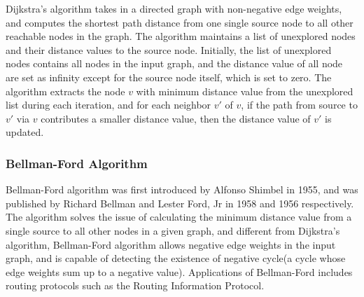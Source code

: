 Dijkstra's algorithm takes in a directed graph with non-negative edge weights, and computes the shortest path distance from one single source node to all other reachable nodes in the graph. The algorithm maintains a list of unexplored nodes and their distance values to the source node. Initially, the list of unexplored nodes contains all nodes in the input graph, and the distance value of all node are set as infinity except for the source node itself, which is set to zero. The algorithm extracts the node $v$ with minimum distance value from the unexplored list during each iteration, and for each neighbor $v'$ of $v$, if the path from source to $v'$ via $v$ contributes a smaller distance value, then the distance value of $v'$ is updated. 

\subsubsection*{Bellman-Ford Algorithm}
Bellman-Ford algorithm was first introduced by Alfonso Shimbel in 1955, and was published by Richard Bellman and Lester Ford, Jr in 1958 and 1956 respectively. The algorithm solves the issue of calculating the minimum distance value from a single source to all other nodes in a given graph, and different from Dijkstra's algorithm, Bellman-Ford algorithm allows negative edge weights in the input graph, and is capable of detecting the existence of negative cycle(a cycle whose edge weights sum up to a negative value). Applications of Bellman-Ford includes routing protocols such as the Routing Information Protocol. 